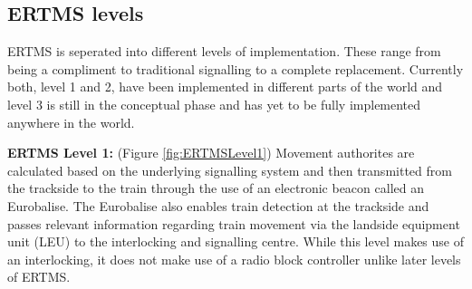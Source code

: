 \label{sec:theertms}
\subsection*{ERTMS levels}
ERTMS is seperated into different levels of implementation. These range from being a compliment to traditional signalling to a complete replacement. Currently both, level 1 and 2, have been implemented in different parts of the world and level 3 is still in the conceptual phase and has yet to be fully implemented anywhere in the world.

\textbf{ERTMS Level 1:} (Figure \ref{fig:ERTMSLevel1}) Movement authorites are calculated based on the underlying signalling system and then transmitted from the trackside to the train through the use of an electronic beacon called an Eurobalise.  The Eurobalise also enables train detection at the trackside and passes relevant information regarding train movement via the landside equipment unit (LEU) to the interlocking and signalling centre. While this level makes use of an interlocking,  it does not make use of a radio block controller unlike later levels of ERTMS.  \\

